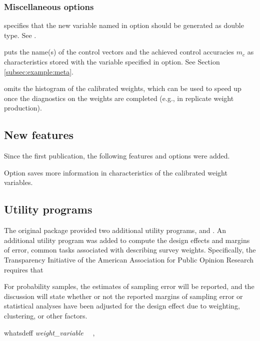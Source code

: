 \subsubsection{Miscellaneous options}

\hangpara
{} specifies that the new variable named in 
option should be generated as double type. See .

\hangpara
{} puts the name(s) of the control vectors and the achieved control
    accuracies $m_c$ as characteristics stored with the variable specified in
     option. See Section \ref{subsec:example:meta}.

\hangpara
{} omits the histogram of the calibrated weights, which can be
used to speed up  once the diagnostics on the weights
are completed (e.g., in replicate weight production).

\subsection{New features}

Since the first publication, the following features and options were added.

Option  saves more information in characteristics of the calibrated
weight variables.

\subsection{Utility programs}

The original package  provided two additional utility programs,
 and . An additional utility program was added
to compute the design effects and margins of error, common tasks associated
with describing survey weights. Specifically, the Transparency Initiative
of the American Association for Public Opinion Research 
\citep{aapor:2014:ti:terms}
requires that 

\begin{cite}
For probability samples, the estimates of sampling error will be reported, and the discussion will state whether or not the reported margins of sampling error or statistical analyses have been adjusted for the design effect due to weighting, clustering, or other factors.
\end{cite}

\begin{stsyntax}
whatsdeff 
{\it weight\_variable}
\optif\
\optin\
,
\end{stsyntax}

